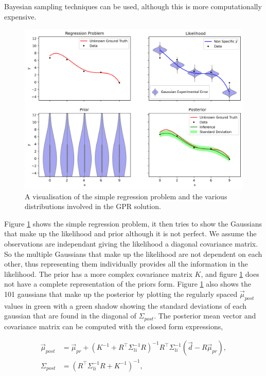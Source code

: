 Bayesian sampling techniques can be used, although this is more computationally expensive.

\begin{figure}[H]
  \centering
  \includegraphics[width=13cm]{images/gprvis.png}
  \caption{A visualisation of the simple regression problem and the various distributions involved in the GPR solution.}
  \label{fig:gprvis}
\end{figure}

Figure \ref{fig:gprvis} shows the simple regression problem, it then tries to show the Gaussians that make up the likelihood and prior although it is not perfect. We assume the observations are independant giving the likelihood a diagonal covariance matrix. So the multiple Gaussians that make up the likelihood are not dependent on each other, thus representing them individually provides all the information in the likelihood. The prior has a more complex covariance matrix $K$, and figure \ref{fig:gprvis} does not have a complete representation of the priors form. Figure \ref{fig:gprvis} also shows the 101 gaussians that make up the posterior by plotting the regularly spaced $\vec{\mu}_{post}$ values in green with a green shadow showing the standard deviations of each gaussian that are found in the diagonal of $\Sigma_{post}$. The posterior mean vector and covariance matrix can be computed with the closed form expressions,

\begin{align}
\label{eq:mupost}
\vec{\mu}_{post} &= \vec{\mu}_{pr} + (K^{-1} + R^{\top} \Sigma_{li}^{-1} R)^{-1} R^{\top} \Sigma_{li}^{-1} (\vec{d} - R \vec{\mu}_{pr}),\\
\label{eq:covpost}
\Sigma_{post} &= \left(R^\top \Sigma_{li}^{-1} R + K^{-1}\right)^{-1},
\end{align}


